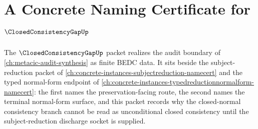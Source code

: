 \chapter{A Concrete Naming Certificate for $\ClosedConsistencyGapUp$}
\label{ch:concrete-instances-closed-consistency-gap-namecert}

The $\ClosedConsistencyGapUp$ packet realizes the audit boundary of \autoref{ch:metacic-audit-synthesis} as finite BEDC data. It sits beside the subject-reduction packet of \autoref{ch:concrete-instances-subjectreduction-namecert} and the typed normal-form endpoint of \autoref{ch:concrete-instances-typedreductionnormalform-namecert}: the first names the preservation-facing route, the second names the terminal normal-form surface, and this packet records why the closed-normal consistency branch cannot be read as unconditional closed consistency until the subject-reduction discharge socket is supplied.

